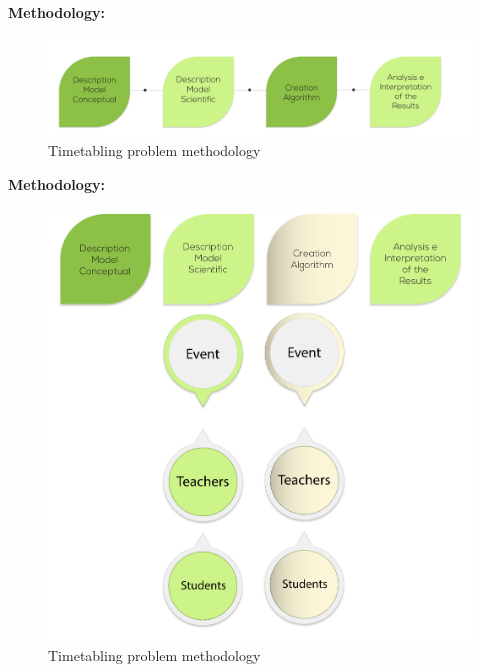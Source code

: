 \documentclass[centering]{report}
\newenvironment{slide}
    {\newpage
    \vspace*{\fill}
    }
    { 
     \vspace*{\fill}
    }
\begin{document}
\begin{slide}
\textbf{Methodology:}\\

\begin{figure}[h!]
  \centering
  \includegraphics[width=1.1\linewidth]{images/methodologyflow.png}
  \caption{\label{fig:methodologyflow}Timetabling problem methodology}
\end{figure}
\end{slide}


\begin{slide}
\textbf{Methodology:}\\

\begin{figure}[h!]
  \centering
  \includegraphics[width=0.7\linewidth]{images/methodologyflow2.png}
  \caption{\label{fig:methodologyflow2}Timetabling problem methodology}
\end{figure}
\end{slide}
\end{document}
